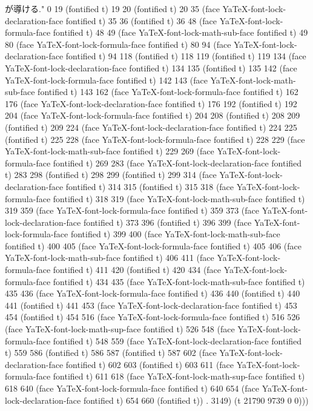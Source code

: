 が導ける." 0 19 (fontified t) 19 20 (fontified t) 20 35 (face YaTeX-font-lock-declaration-face fontified t) 35 36 (fontified t) 36 48 (face YaTeX-font-lock-formula-face fontified t) 48 49 (face YaTeX-font-lock-math-sub-face fontified t) 49 80 (face YaTeX-font-lock-formula-face fontified t) 80 94 (face YaTeX-font-lock-declaration-face fontified t) 94 118 (fontified t) 118 119 (fontified t) 119 134 (face YaTeX-font-lock-declaration-face fontified t) 134 135 (fontified t) 135 142 (face YaTeX-font-lock-formula-face fontified t) 142 143 (face YaTeX-font-lock-math-sub-face fontified t) 143 162 (face YaTeX-font-lock-formula-face fontified t) 162 176 (face YaTeX-font-lock-declaration-face fontified t) 176 192 (fontified t) 192 204 (face YaTeX-font-lock-formula-face fontified t) 204 208 (fontified t) 208 209 (fontified t) 209 224 (face YaTeX-font-lock-declaration-face fontified t) 224 225 (fontified t) 225 228 (face YaTeX-font-lock-formula-face fontified t) 228 229 (face YaTeX-font-lock-math-sub-face fontified t) 229 269 (face YaTeX-font-lock-formula-face fontified t) 269 283 (face YaTeX-font-lock-declaration-face fontified t) 283 298 (fontified t) 298 299 (fontified t) 299 314 (face YaTeX-font-lock-declaration-face fontified t) 314 315 (fontified t) 315 318 (face YaTeX-font-lock-formula-face fontified t) 318 319 (face YaTeX-font-lock-math-sub-face fontified t) 319 359 (face YaTeX-font-lock-formula-face fontified t) 359 373 (face YaTeX-font-lock-declaration-face fontified t) 373 396 (fontified t) 396 399 (face YaTeX-font-lock-formula-face fontified t) 399 400 (face YaTeX-font-lock-math-sub-face fontified t) 400 405 (face YaTeX-font-lock-formula-face fontified t) 405 406 (face YaTeX-font-lock-math-sub-face fontified t) 406 411 (face YaTeX-font-lock-formula-face fontified t) 411 420 (fontified t) 420 434 (face YaTeX-font-lock-formula-face fontified t) 434 435 (face YaTeX-font-lock-math-sub-face fontified t) 435 436 (face YaTeX-font-lock-formula-face fontified t) 436 440 (fontified t) 440 441 (fontified t) 441 453 (face YaTeX-font-lock-declaration-face fontified t) 453 454 (fontified t) 454 516 (face YaTeX-font-lock-formula-face fontified t) 516 526 (face YaTeX-font-lock-math-sup-face fontified t) 526 548 (face YaTeX-font-lock-formula-face fontified t) 548 559 (face YaTeX-font-lock-declaration-face fontified t) 559 586 (fontified t) 586 587 (fontified t) 587 602 (face YaTeX-font-lock-declaration-face fontified t) 602 603 (fontified t) 603 611 (face YaTeX-font-lock-formula-face fontified t) 611 618 (face YaTeX-font-lock-math-sup-face fontified t) 618 640 (face YaTeX-font-lock-formula-face fontified t) 640 654 (face YaTeX-font-lock-declaration-face fontified t) 654 660 (fontified t)) . 3149) (t 21790 9739 0 0)))
